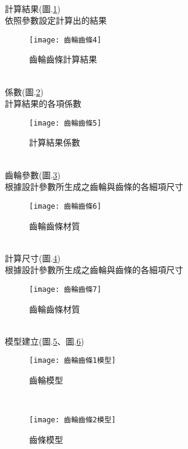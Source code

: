\begin{itemize}
\begin{figure}[hbt!]
\begin{center}
		\end{center}
		\end{figure}
		\\
		計算結果(圖.\ref{2.41}) \\
		依照參數設定計算出的結果\\
		\begin{figure}[hbt!]
		\begin{center}
		\texttt{[image: 齒輪齒條4]}
		\caption{\Large 齒輪齒條計算結果}\label{2.41}
		\end{center}
		\end{figure}
		\\
		係數(圖.\ref{2.42}) \\
		計算結果的各項係數\\
		\begin{figure}[hbt!]
		\begin{center}
		\texttt{[image: 齒輪齒條5]}
		\caption{\Large 計算結果係數}\label{2.42}
		\end{center}
		\end{figure}
		\\
		齒輪參數(圖.\ref{2.43}) \\
		根據設計參數所生成之齒輪與齒條的各細項尺寸\\
		\begin{figure}[hbt!]
		\begin{center}
		\texttt{[image: 齒輪齒條6]}
		\caption{\Large 齒輪齒條材質}\label{2.43}
		\end{center}
		\end{figure}
		\\
		計算尺寸(圖.\ref{2.431}) \\
		根據設計參數所生成之齒輪與齒條的各細項尺寸\\
		\begin{figure}[hbt!]
		\begin{center}
		\texttt{[image: 齒輪齒條7]}
		\caption{\Large 齒輪齒條材質}\label{2.431}
		\end{center}
		\end{figure}
		\\
		模型建立(圖.\ref{2.44}、圖.\ref{2.45}) \\
		\begin{figure}[hbt!]
		\begin{center}
		\texttt{[image: 齒輪齒條1模型]}
		\caption{\Large 齒輪模型}\label{2.44}
		\end{center}
		\end{figure}
		\\
		\begin{figure}[hbt!]
		\begin{center}
		\texttt{[image: 齒輪齒條2模型]}
		\caption{\Large 齒條模型}\label{2.45}
		\end{center}
		\end{figure}
		\\
		

\end{itemize}
